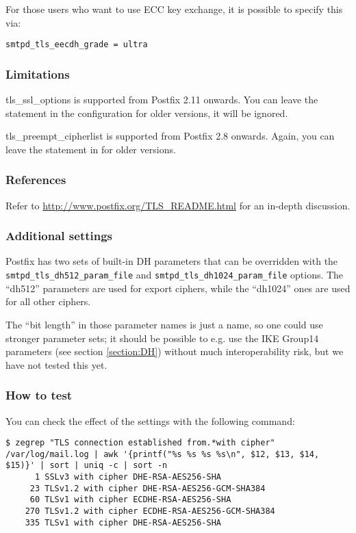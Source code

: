 For those users who want to use ECC key exchange, it is possible to specify this via:
\begin{lstlisting}
smtpd_tls_eecdh_grade = ultra
\end{lstlisting}

\subsubsection{Limitations}
tls\_ssl\_options is supported from Postfix 2.11 onwards. You can
leave the statement in the configuration for older versions, it will
be ignored.

tls\_preempt\_cipherlist is supported from Postfix 2.8 onwards. Again,
you can leave the statement in for older versions.

\subsubsection{References}
Refer to \url{http://www.postfix.org/TLS_README.html} for an in-depth
discussion.

\subsubsection{Additional settings}
Postfix has two sets of built-in DH parameters that can be overridden
with the \verb|smtpd_tls_dh512_param_file|
and \verb|smtpd_tls_dh1024_param_file| options. The ``dh512''
parameters are used for export ciphers, while the ``dh1024'' ones are
used for all other ciphers.

The ``bit length'' in those parameter names is just a name, so one
could use stronger parameter sets; it should be possible to e.g. use the
IKE Group14 parameters (see section \ref{section:DH}) without much
interoperability risk, but we have not tested this yet.



\subsubsection{How to test}
You can check the effect of the settings with the following command:
\begin{lstlisting}
$ zegrep "TLS connection established from.*with cipher" /var/log/mail.log | awk '{printf("%s %s %s %s\n", $12, $13, $14, $15)}' | sort | uniq -c | sort -n
      1 SSLv3 with cipher DHE-RSA-AES256-SHA
     23 TLSv1.2 with cipher DHE-RSA-AES256-GCM-SHA384
     60 TLSv1 with cipher ECDHE-RSA-AES256-SHA
    270 TLSv1.2 with cipher ECDHE-RSA-AES256-GCM-SHA384
    335 TLSv1 with cipher DHE-RSA-AES256-SHA
\end{lstlisting}

